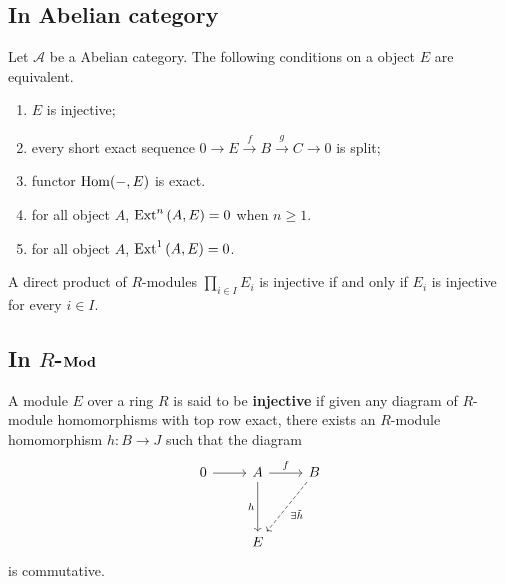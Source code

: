 \documentclass[12pt, oneside]{book}
\begin{document}
\subsection{In Abelian category} %
\begin{theorem}
    Let $\mathcal{A}$ be a Abelian category.
    The following conditions on a object $E$ are equivalent.
    \begin{enumerate}
        \item
              $E$ is injective;

        \item
              every short exact sequence $0 \rightarrow E \xrightarrow{f} B \xrightarrow{g} C \rightarrow 0$ is split;
        \item
              functor $\operatorname{\operatorname{Hom}}(-,E)$ is exact.
        \item
              for all object $A$, $\operatorname{\operatorname{Ext}}^n\left(A,E\right) = 0$ when $n\geq 1$.
        \item
              for all object $A$, $\operatorname{\operatorname{Ext}}^1\left(A,E\right) = 0$.
    \end{enumerate}
\end{theorem}

\begin{corollary}
    A direct product of $R$-modules $\prod_{i \in I} E_{i}$ is injective if and only if $E_{i}$ is injective for every $i \in I$.
\end{corollary}


\subsection{In $R$-$\mathbf{Mod}$}

\begin{definition}
    A module $E$ over a ring $R$ is said to be \textbf{injective} if given any diagram of $R$-module homomorphisms with top row exact, there exists an $R$-module homomorphism ${h}: B \rightarrow {J}$ such that the diagram
    \begin{equation*}
        \begin{tikzcd}
            0 \arrow[r] & A \arrow[dd,"h"']\arrow[r,"f"] & B \arrow[ldd,dashed, "\exists \tilde{h}"]  \\
            & &  \\
            & E &
        \end{tikzcd}
    \end{equation*}
    is commutative.
\end{definition}
\end{document}
